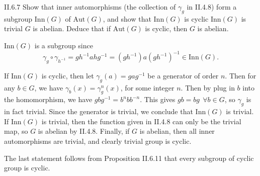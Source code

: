 \begin{problem}{II.6.7}
Show that inner automorphisms (the collection of $\gamma_g$ in II.4.8) form a subgroup $\text{Inn}(G)$ of $\text{Aut}(G)$, and show that $\text{Inn}(G)$ is cyclic \iffw $\text{Inn}(G)$ is trivial \iffw $G$ is abelian. Deduce that if $\text{Aut}(G)$ is cyclic, then $G$ is abelian.
\end{problem}
\begin{pf}
$\text{Inn}(G)$ is a subgroup since
\[
\gamma_g \circ \gamma_{h^{-1}} = gh^{-1}ahg^{-1} = (gh^{-1})a(gh^{-1})^{-1} \in \text{Inn}(G).
\]

If $\text{Inn}(G)$ is cyclic, then let $\gamma_g(a) = gag^{-1}$ be a generator of order $n$. Then for any $b \in G$, we have $\gamma_b(x) = \gamma_g^n(x)$, for some integer $n$. Then by plug in $b$ into the homomorphism, we have $gbg^{-1} = b^nbb^{-n}$. This gives $gb = bg \:\: \forall b \in G$, so $\gamma_g$ is in fact trivial. Since the generator is trivial, we conclude that $\text{Inn}(G)$ is trivial. If $\text{Inn}(G)$ is trivial, then the function given in II.4.8 can only be the trivial map, so $G$ is abelian by II.4.8. Finally, if $G$ is abelian, then all inner automorphisms are trivial, and clearly trivial group is cyclic.

The last statement follows from Proposition II.6.11 that every subgroup of cyclic group is cyclic.
\end{pf}

